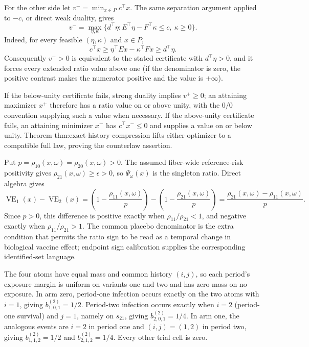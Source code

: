 For the other side let \(v^-=\min_{x\in P}c^\top x\).  The same separation argument applied to \(-c\), or direct weak duality, gives
\[
v^-=\max_{\eta,\kappa}\{d^\top\eta:
E^\top\eta-F^\top\kappa\leq c,\ \kappa\geq0\}.
\]
Indeed, for every feasible \((\eta,\kappa)\) and \(x\in P\),
\[
c^\top x\geq\eta^\top Ex-\kappa^\top Fx
\geq d^\top\eta.
\]
Consequently \(v^->0\) is equivalent to the stated certificate with \(d^\top\eta>0\), and it forces every extended ratio value above one (if the denominator is zero, the positive contrast makes the numerator positive and the value is \(+\infty\)).

If the below-unity certificate fails, strong duality implies \(v^+\geq0\); an attaining maximizer \(x^+\) therefore has a ratio value on or above unity, with the \(0/0\) convention supplying such a value when necessary.  If the above-unity certificate fails, an attaining minimizer \(x^-\) has \(c^\top x^-\leq0\) and supplies a value on or below unity.  Theorem \(\text{thm:exact-history-compression}\) lifts either optimizer to a compatible full law, proving the counterlaw assertion.

Put \(p=\rho_{10}(x,\omega)=\rho_{20}(x,\omega)>0\).  The assumed fiber-wide reference-risk positivity gives \(\rho_{21}(x,\omega)\geq\epsilon>0\), so \(\Psi_\omega(x)\) is the singleton ratio.  Direct algebra gives
\[
\operatorname{VE}_1(x)-\operatorname{VE}_2(x)
=\left(1-\frac{\rho_{11}(x,\omega)}p\right)
-\left(1-\frac{\rho_{21}(x,\omega)}p\right)
=\frac{\rho_{21}(x,\omega)-\rho_{11}(x,\omega)}p.
\]
Since \(p>0\), this difference is positive exactly when \(\rho_{11}/\rho_{21}<1\), and negative exactly when \(\rho_{11}/\rho_{21}>1\).  The common placebo denominator is the extra condition that permits the ratio sign to be read as a temporal change in biological vaccine effect; endpoint sign calibration supplies the corresponding identified-set language.

The four atoms have equal mass and common history \((i,j)\), so each period's exposure margin is uniform on variants one and two and has zero mass on no exposure.  In arm zero, period-one infection occurs exactly on the two atoms with \(i=1\), giving \(b^{(2)}_{1,0,1}=1/2\).  Period-two infection occurs exactly when \(i=2\) (period-one survival) and \(j=1\), namely on \(s_{21}\), giving \(b^{(2)}_{2,0,1}=1/4\).  In arm one, the analogous events are \(i=2\) in period one and \((i,j)=(1,2)\) in period two, giving \(b^{(2)}_{1,1,2}=1/2\) and \(b^{(2)}_{2,1,2}=1/4\).  Every other trial cell is zero.

